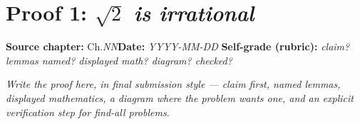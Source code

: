 \documentclass[11pt]{article}
\begin{document}
\section*{Proof 1: \emph{$\sqrt{2}$ is irrational}}
\textbf{Source chapter:} Ch.\emph{NN}\quad \textbf{Date:} \emph{YYYY-MM-DD}\quad
\textbf{Self-grade (rubric):} \emph{claim? lemmas named? displayed math? diagram? checked?}
\medskip

\emph{Write the proof here, in final submission style — claim first, named lemmas,
displayed mathematics, a diagram where the problem wants one, and an explicit
verification step for find-all problems.}
\end{document}
